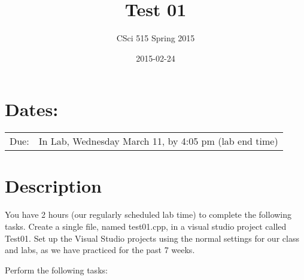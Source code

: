 \documentclass[11pt]{article}
\title{Test 01}
\author{CSci 515 Spring 2015}
\date{2015-02-24}
\begin{document}
\maketitle


\section*{Dates:}
\label{sec-1}


\begin{center}
\begin{tabular}{ll}
 Due:  &  In Lab, Wednesday March 11, by 4:05 pm (lab end time)  \\
\end{tabular}
\end{center}
\section*{Description}
\label{sec-2}

You have 2 hours (our regularly scheduled lab time) to complete the
following tasks.  Create a single file, named test01.cpp, in a visual
studio project called Test01.  Set up the Visual Studio projects using
the normal settings for our class and labs, as we have practiced for
the past 7 weeks.

Perform the following tasks:
\end{document}
